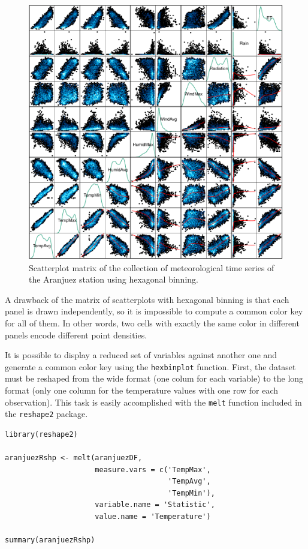 \begin{figure}[htbp]
\centering
\includegraphics[width=.9\linewidth]{figs/aranjuezSplomHexbin.pdf}
\caption{Scatterplot matrix of the collection of meteorological time series of the Aranjuez station using hexagonal binning. \label{fig:aranjuezSplomHexbin}}
\end{figure}

A drawback of the matrix of scatterplots with hexagonal binning is
that each panel is drawn independently, so it is impossible to compute
a common color key for all of them. In other words, two cells with
exactly the same color in different panels encode different point
densities.

It is possible to display a reduced set of variables against another
one and generate a common color key using the \texttt{hexbinplot}
function. First, the dataset must be reshaped from the wide format
(one colum for each variable) to the long format (only one column for
the temperature values with one row for each observation). This task
is easily accomplished with the \texttt{melt} function included in the
\texttt{reshape2} package.


\lstset{language=r,label= ,caption= ,captionpos=b,numbers=none}
\begin{lstlisting}
library(reshape2)

aranjuezRshp <- melt(aranjuezDF,
                     measure.vars = c('TempMax',
                                      'TempAvg',
                                      'TempMin'),
                     variable.name = 'Statistic',
                     value.name = 'Temperature')

summary(aranjuezRshp)
\end{lstlisting}


